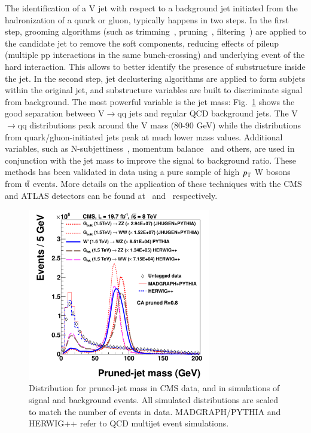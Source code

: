 \documentclass[3p,times,twocolumn]{elsarticle}
\begin{document}
The identification of a V jet
with respect to a background jet initiated from the hadronization 
of a quark or gluon, typically happens in two
steps. In the first step, grooming algorithms (such as trimming~\cite{Krohn:2009th},
pruning~\cite{Ellis:2009su,Ellis:2009me},
filtering~\cite{Butterworth:2008iy}) are applied to the candidate jet to remove
the soft components, reducing effects of pileup (multiple pp interactions
in the same bunch-crossing) and underlying event of the hard
interaction. This allows to better identify the presence of
substructure inside the jet. In the second step, jet declustering
algorithms are applied to form subjets within the original jet, and
substructure variables are built to discriminate signal from
background. The most powerful variable is the jet mass: Fig.~\ref{fig:CMS_JetMass}
shows the good separation between V$\rightarrow$qq jets and regular
QCD background jets. The V$\rightarrow$qq distributions 
peak around the V mass (80-90 GeV) while the distributions from 
quark/gluon-initiated jets peak at much lower mass values. 
Additional variables, such as N-subjettiness~\cite{Thaler:2010tr}, 
momentum balance~\cite{Butterworth:2008iy} and others, are used
in conjunction with the jet mass to improve the signal to background ratio.
These methods has been validated in data using a pure sample of high
$p_{\rm{T}}$ W bosons from $\rm{t}\bar{\rm{t}}$ events. 
More details on the application of these techniques with the CMS and
ATLAS detectors can be found at~\cite{CMS:2013uea} and~\cite{ATLAS:ATL-PHYS-PUB-2014-004}
respectively.

\begin{figure}[htbp]
\centering
\includegraphics[width=8cm]{CMS_JetMass.pdf}
\caption{Distribution for pruned-jet mass in CMS data, and in simulations of signal and background events. All simulated distributions are scaled to match the number of events in data. MADGRAPH/PYTHIA and HERWIG++ refer to QCD multijet event simulations.~\cite{Khachatryan:2014hpa}}\label{fig:CMS_JetMass}
\end{figure}
\end{document}
